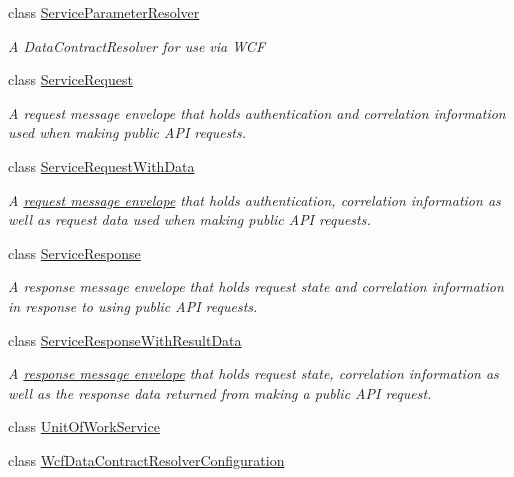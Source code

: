 \begin{DoxyCompactItemize}
class \hyperlink{classCqrs_1_1Services_1_1ServiceParameterResolver}{Service\+Parameter\+Resolver}
\begin{DoxyCompactList}\small\item\em A Data\+Contract\+Resolver for use via W\+CF \end{DoxyCompactList}\item 
class \hyperlink{classCqrs_1_1Services_1_1ServiceRequest}{Service\+Request}
\begin{DoxyCompactList}\small\item\em A request message envelope that holds authentication and correlation information used when making public A\+PI requests. \end{DoxyCompactList}\item 
class \hyperlink{classCqrs_1_1Services_1_1ServiceRequestWithData}{Service\+Request\+With\+Data}
\begin{DoxyCompactList}\small\item\em A \hyperlink{}{request message envelope} that holds authentication, correlation information as well as request data used when making public A\+PI requests. \end{DoxyCompactList}\item 
class \hyperlink{classCqrs_1_1Services_1_1ServiceResponse}{Service\+Response}
\begin{DoxyCompactList}\small\item\em A response message envelope that holds request state and correlation information in response to using public A\+PI requests. \end{DoxyCompactList}\item 
class \hyperlink{classCqrs_1_1Services_1_1ServiceResponseWithResultData}{Service\+Response\+With\+Result\+Data}
\begin{DoxyCompactList}\small\item\em A \hyperlink{interfaceCqrs_1_1Services_1_1IServiceResponse}{response message envelope} that holds request state, correlation information as well as the response data returned from making a public A\+PI request. \end{DoxyCompactList}\item 
class \hyperlink{classCqrs_1_1Services_1_1UnitOfWorkService}{Unit\+Of\+Work\+Service}
\item 
class \hyperlink{classCqrs_1_1Services_1_1WcfDataContractResolverConfiguration}{Wcf\+Data\+Contract\+Resolver\+Configuration}
\end{DoxyCompactItemize}
